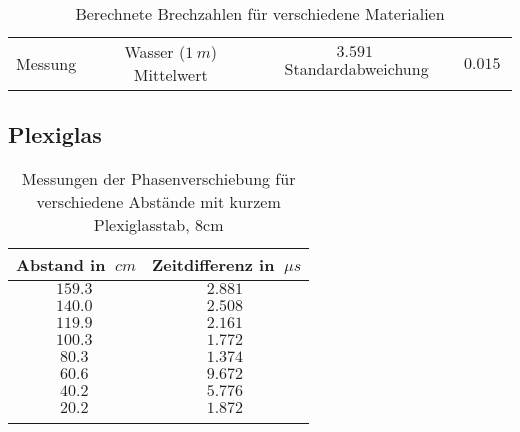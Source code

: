 \begin{table}[h!]
    \begin{center}
        \caption{Berechnete Brechzahlen für verschiedene Materialien}
        \begin{tabular}{cccc}
            \hline
            Messung            & Wasser ($\SI{1}{m}$)
            Mittelwert         & $\SI{3,591}{}$
            Standardabweichung & $\SI{0,015}{}$
            \hline
            \label{tab:Ergebnisse-Brechzahlen}
        \end{tabular}
    \end{center}
\end{table}


\subsection{Plexiglas}

\begin{table}[h!]
    \begin{center}
        \caption{Messungen der Phasenverschiebung für verschiedene Abstände mit kurzem Plexiglasstab, 8cm}
        \begin{tabular}{cc}
            \hline
            Abstand in $\SI{}{cm}$ & Zeitdifferenz in $\SI{}{\mu s}$ \\
            \hline
            $\SI{159,3}{}$    & $\SI{2,881}{}$ \\
            $\SI{140,0}{}$    & $\SI{2,508}{}$ \\
            $\SI{119,9}{}$    & $\SI{2,161}{}$ \\
            $\SI{100,3}{}$    & $\SI{1,772}{}$ \\
            $\SI{80,3}{}$     & $\SI{1,374}{}$ \\
            $\SI{60,6}{}$     & $\SI{9,672}{}$ \\
            $\SI{40,2}{}$     & $\SI{5,776}{}$ \\
            $\SI{20,2}{}$     & $\SI{1,872}{}$ \\
            \hline
            \label{tab:Messwerte-Zeitdiffernz-Abstand-Plexi-kurz}
        \end{tabular}
    \end{center}
\end{table}

